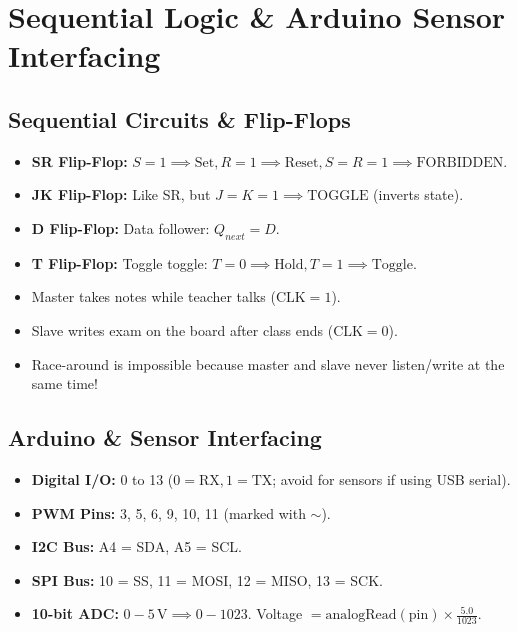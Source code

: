 \chapter{Sequential Logic \& Arduino Sensor Interfacing}

\section{Sequential Circuits \& Flip-Flops}
\begin{notebox}
\begin{itemize}[leftmargin=*]
    \item \textbf{SR Flip-Flop:} $S=1 \implies \text{Set}, R=1 \implies \text{Reset}, S=R=1 \implies \text{FORBIDDEN}$.
    \item \textbf{JK Flip-Flop:} Like SR, but $J=K=1 \implies \text{TOGGLE}$ (inverts state).
    \item \textbf{D Flip-Flop:} Data follower: $Q_{next} = D$.
    \item \textbf{T Flip-Flop:} Toggle toggle: $T=0 \implies \text{Hold}, T=1 \implies \text{Toggle}$.
\end{itemize}
\end{notebox}

\begin{trickbox}
\begin{itemize}[leftmargin=*]
    \item Master takes notes while teacher talks ($\text{CLK}=1$).
    \item Slave writes exam on the board after class ends ($\text{CLK}=0$).
    \item Race-around is impossible because master and slave never listen/write at the same time!
\end{itemize}
\end{trickbox}

\section{Arduino \& Sensor Interfacing}
\begin{notebox}
\begin{itemize}[leftmargin=*]
    \item \textbf{Digital I/O:} 0 to 13 ($0=\text{RX}, 1=\text{TX}$; avoid for sensors if using USB serial).
    \item \textbf{PWM Pins:} 3, 5, 6, 9, 10, 11 (marked with $\sim$).
    \item \textbf{I2C Bus:} A4 = SDA, A5 = SCL.
    \item \textbf{SPI Bus:} 10 = SS, 11 = MOSI, 12 = MISO, 13 = SCK.
    \item \textbf{10-bit ADC:} $0-5\,\text{V} \implies 0-1023$. Voltage $= \text{analogRead}(\text{pin}) \times \frac{5.0}{1023}$.
\end{itemize}
\end{notebox}

